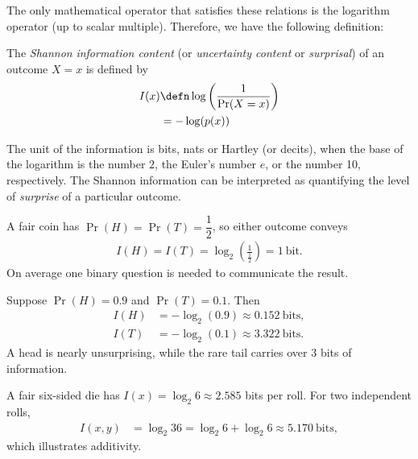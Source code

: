 \documentclass[a4paper, 12pt]{book}
\begin{document}
The only mathematical operator that satisfies these relations is the logarithm operator (up to scalar multiple). Therefore, we have the following definition:
\begin{definition}
    The \emph{Shannon} \emph{information content} (or \emph{uncertainty content} or \emph{surprisal}) of an outcome $X = x$ is defined by
    \begin{align}
    I(x) &\defn \log\left(  \frac{1}{\Pr(X = x)} \right) \\
    &= -\log(p(x))
    \end{align}
\end{definition}
The unit of the information is bits, nats or Hartley (or decits), when the base of the logarithm is the number $2$, the Euler's number $e$, or the number 10, respectively. The Shannon information can be interpreted as quantifying the level of \emph{surprise} of a particular outcome.

\begin{example}
    A fair coin has $\Pr(H)=\Pr(T)=\dfrac{1}{2}$, so either outcome conveys
    \begin{align}
        I(H)=I(T)=\log_2\left(\frac{1}{\frac{1}{2}}\right)=1~\text{bit}.
    \end{align}
    On average one binary question is needed to communicate the result.
\end{example}

\begin{example}
    Suppose $\Pr(H)=0.9$ and $\Pr(T)=0.1$. Then
    \begin{align}
        I(H) &= -\log_2(0.9) \approx 0.152~\text{bits}, \\
        I(T) &= -\log_2(0.1) \approx 3.322~\text{bits}.
    \end{align}
    A head is nearly unsurprising, while the rare tail carries over 3 bits of information.
\end{example}

\begin{example}
    A fair six-sided die has $I(x)=\log_2 6\approx2.585$ bits per roll. For two independent rolls,
    \begin{align}
        I(x,y) &= \log_2 36 = \log_2 6 + \log_2 6 \approx 5.170~\text{bits},
    \end{align}
    which illustrates additivity.
\end{example}
\end{document}

